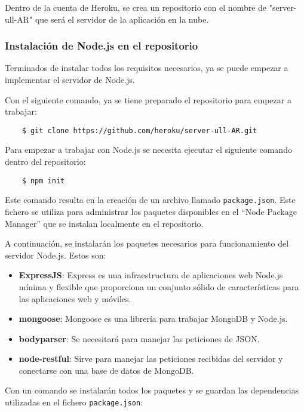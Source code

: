 Dentro de la cuenta de Heroku, se crea un repositorio con el nombre de "server-ull-AR" que será el servidor de la aplicación en la nube.

\subsubsection{Instalación de Node.js en el repositorio}

Terminados de instalar todos los requisitos necesarios, ya se puede empezar a implementar el servidor de Node.js.

Con el siguiente comando, ya se tiene preparado el repositorio para empezar a trabajar:

\begin{lstlisting}
    $ git clone https://github.com/heroku/server-ull-AR.git
\end{lstlisting}

Para empezar a trabajar con Node.js se necesita ejecutar el siguiente comando dentro del repositorio:

\begin{lstlisting}
    $ npm init 
\end{lstlisting}

Este comando resulta en la creación de un archivo llamado \texttt{package.json}. Este fichero se utiliza para administrar los paquetes disponibles en el ``Node Package Manager'' que se instalan localmente en el repositorio.

A continuación, se instalarán los paquetes necesarios para funcionamiento del servidor Node.js. Estos son:

\begin{itemize}
    \item \textbf{ExpressJS}: Express es una infraestructura de aplicaciones web Node.js mínima y flexible que proporciona un conjunto sólido de características para las aplicaciones web y móviles.
    \item \textbf{mongoose}: Mongoose es una librería para trabajar MongoDB y Node.js.
    \item \textbf{bodyparser}: Se necesitará para manejar las peticiones de JSON.
    \item \textbf{node-restful}: Sirve para manejar las peticiones recibidas del servidor y conectarse con una base de datos de MongoDB.
\end{itemize}

Con un comando se instalarán todos los paquetes y se guardan las dependencias utilizadas en el fichero \texttt{package.json}:

